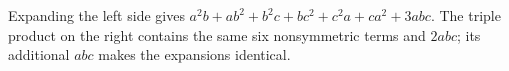 Expanding the left side gives $a^2b+ab^2+b^2c+bc^2+c^2a+ca^2+3abc$. The triple product on the right contains the same six nonsymmetric terms and $2abc$; its additional $abc$ makes the expansions identical.
